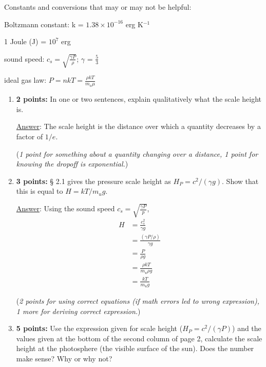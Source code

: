 \documentclass[12pt]{article}
\begin{document}
Constants and conversions that may or may not be helpful:
\begin{itemize*}
    \item Boltzmann constant: k = $1.38\times10^{-16}$ erg K$^{-1}$
    \item 1 Joule (J) = $10^{7}$ erg
    \item sound speed: $c_s = \sqrt{\frac{\gamma{P}}{\rho}}$;
        $\gamma$ = $\frac{5}{3}$
    \item ideal gas law: $P = nkT = \frac{\rho{kT}}{m_u{\mu}}$
\end{itemize*}


\begin{enumerate}
    \item \textbf{2 points:} In one or two sentences, explain
        qualitatively what the scale height is.

        {\small\underline{Answer}: The scale height is the distance
            over which a quantity decreases by a factor of $1/e$.

        (\emph{1 point for something about a quantity changing over
        a distance, 1 point for knowing the dropoff is exponential.})}

    \item \textbf{3 points:} \S{} 2.1 gives the pressure scale
        height as $H_{P} = c^{2}/(\gamma{g})$. Show that this is
        equal to $H = kT/m_{u}g$.

        {\small\underline{Answer}:
            Using the sound speed $c_s = \sqrt{\frac{\gamma{P}}{p}}$,
            \begin{align*}
                H &= \frac{c_s^2}{\gamma{g}}\\
                  &= \frac{(\gamma{P}/\rho)}{\gamma{g}}\\
                 &= \frac{P}{\rho{g}}\\
                 &= \frac{\rho{kT}}{m_{u}\rho{g}}\\
                 &= \frac{kT}{m_{u}{g}}
            \end{align*}

        (\emph{2 points for using correct equations (if math errors
        led to wrong expression), 1 more for deriving
        correct expression.})}

    \item \textbf{5 points:} Use the expression given for scale
        height ($H_{P} = c^{2}/(\gamma{P})$) and the values given at
        the bottom of the second column of page 2, calculate the
        scale height at the photosphere (the visible surface of
        the sun). Does the number make sense? Why or why not?


\end{enumerate}
\end{document}
